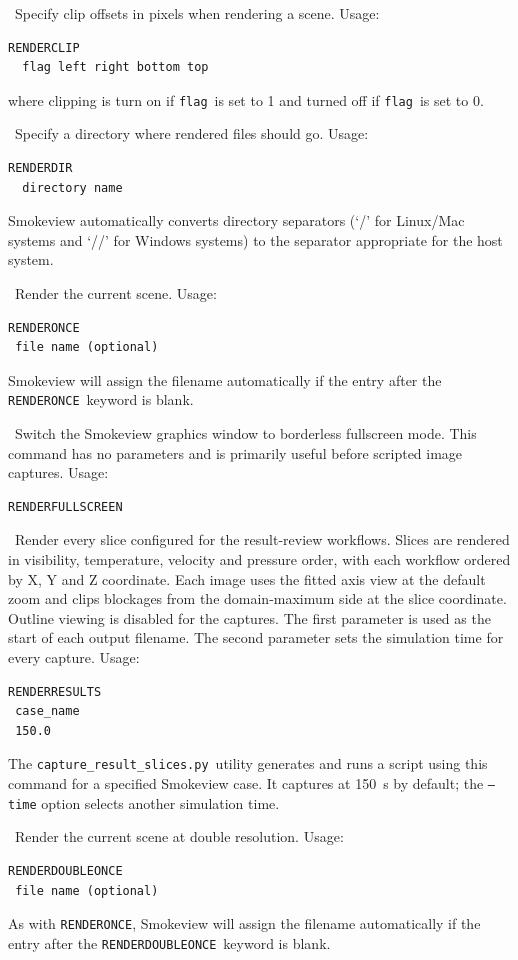 \documentclass[11pt,twoside]{book}
\begin{document}
\ Specify clip offsets in pixels when
rendering a scene.  Usage:
\begin{lstlisting}
RENDERCLIP
  flag left right bottom top
\end{lstlisting}
where clipping is turn on if {\tt flag}\ is set to 1 and
turned off if {\tt flag}\ is set to 0.

\ Specify a
directory where rendered files should go. Usage:
\begin{lstlisting}
RENDERDIR
  directory name
\end{lstlisting}
Smokeview automatically converts directory separators (`/' for Linux/Mac systems
and `//' for Windows systems) to the separator appropriate for the host system.

\ Render the current scene.
Usage:
\begin{lstlisting}
RENDERONCE
 file name (optional)
\end{lstlisting}
Smokeview will assign the filename automatically if the
entry after the {\tt RENDERONCE}\ keyword is blank.

\ Switch the Smokeview graphics window to
borderless fullscreen mode.  This command has no parameters and is primarily
useful before scripted image captures.
Usage:
\begin{lstlisting}
RENDERFULLSCREEN
\end{lstlisting}

\ Render every slice configured for the result-review
workflows.  Slices are rendered in visibility, temperature, velocity and
pressure order, with each workflow ordered by X, Y and Z coordinate.  Each
image uses the fitted axis view at the default zoom and clips blockages from
the domain-maximum side at the slice coordinate.  Outline viewing is disabled
for the captures.  The first parameter is used as the start of each output
filename.  The second parameter sets the simulation time for every capture.
Usage:
\begin{lstlisting}
RENDERRESULTS
 case_name
 150.0
\end{lstlisting}
The {\tt capture_result_slices.py}\ utility generates and runs a script using
this command for a specified Smokeview case.  It captures at 150~s by default;
the {\tt --time} option selects another simulation time.

\ Render the current scene at double resolution.
Usage:
\begin{lstlisting}
RENDERDOUBLEONCE
 file name (optional)
\end{lstlisting}
As with {\tt RENDERONCE}, Smokeview will assign the filename
automatically if the entry after the {\tt RENDERDOUBLEONCE}\ keyword is blank.
\end{document}
